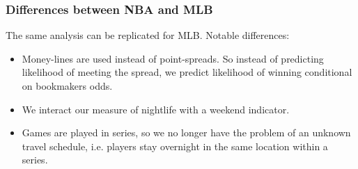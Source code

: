 \documentclass{beamer}
\begin{document}
\begin{frame}   \frametitle{Differences between NBA and MLB}
  The same analysis can be replicated for MLB. Notable differences:
  \vspace{12pt}  
  \begin{itemize}     
    \item Money-lines are used instead of point-spreads. 
      So instead of predicting likelihood of meeting the spread,
      we predict likelihood of winning conditional on bookmakers odds.
    \item We interact our measure of nightlife with a weekend indicator.
    \item Games are played in series, so we no longer have the problem of an unknown travel schedule, i.e. players stay overnight in the same location within a series.   \end{itemize} \end{frame}

\end{document}
